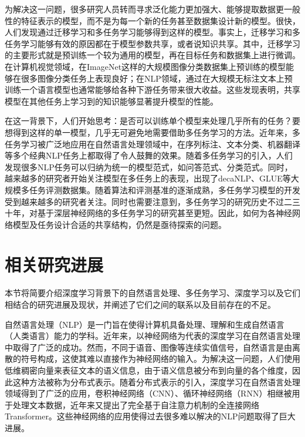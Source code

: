 为解决这一问题，很多研究人员转而寻求泛化能力更加强大、能够提取数据更一般性的特征表示的模型，而不是为每一个新的任务甚至数据集设计新的模型。很快，人们发现通过迁移学习和多任务学习能够得到这样的模型。事实上，迁移学习和多任务学习能够有效的原因都在于模型参数共享，或者说知识共享。其中，迁移学习的主要形式就是预训练一个较为通用的模型，再在目标任务和数据集上进行微调。在计算机视觉领域，在ImageNet\cite{DBLP:conf/cvpr/DengDSLL009}这样的大规模图像分类数据集上预训练的模型能够在很多图像分类任务上表现良好；在NLP领域，通过在大规模无标注文本上预训练一个语言模型也通常能够给各种下游任务带来很大收益\cite{DBLP:conf/naacl/PetersNIGCLZ18}\cite{radford2018improving}。这些发现表明，共享模型在其他任务上学习到的知识能够显著提升模型的性能。

在这一背景下，人们开始思考：是否可以训练单个模型来处理几乎所有的任务？要想得到这样的单一模型，几乎无可避免地需要借助多任务学习的方法。近年来，多任务学习被广泛地应用在自然语言处理领域中，在序列标注、文本分类、机器翻译等多个经典NLP任务上都取得了令人鼓舞的效果。随着多任务学习的引入，人们发现很多NLP任务可以归纳为统一的模型范式，如问答范式\cite{mccann2018natural}、分类范式\cite{radford2018improving}\cite{devlin2018bert}。同时，越来越多的研究者开始关注模型在多任务上的表现，出现了decaNLP\cite{mccann2018natural}、GLUE\cite{DBLP:conf/emnlp/WangSMHLB18}等大规模多任务评测数据集。随着算法和评测基准的逐渐成熟，多任务学习模型的开发受到越来越多的研究者关注。同时也需要注意到，多任务学习的研究历史不过二三十年，对基于深层神经网络的多任务学习的研究甚至更短。因此，如何为各神经网络模型及任务设计合适的共享结构，仍然是亟待探索的问题。

\section{相关研究进展}

本节将简要介绍深度学习背景下的自然语言处理、多任务学习、深度学习以及它们相结合的研究进展及现状，并阐述了它们之间的联系以及目前存在的不足。

自然语言处理（NLP）是一门旨在使得计算机具备处理、理解和生成自然语言（人类语言）能力的学科。近年来，以神经网络为代表的深度学习在自然语言处理\cite{DBLP:journals/jmlr/CollobertWBKKK11}\cite{DBLP:conf/emnlp/BordesCW14}\cite{DBLP:conf/acl/JeanCMB15}\cite{DBLP:conf/nips/SutskeverVL14}中取得了广泛的成功。然而，不同于语音、图像等连续实值信号，自然语言是由离散的符号构成，这使其难以直接作为神经网络的输入。为解决这一问题，人们使用低维稠密向量来表征文本的语义信息\cite{DBLP:conf/nips/MikolovSCCD13}\cite{DBLP:conf/emnlp/PenningtonSM14}，由于语义信息被分布到向量的各个维度，因此这种方法被称为分布式表示。随着分布式表示的引入，深度学习在自然语言处理领域得到了广泛的应用，卷积神经网络（CNN）、循环神经网络（RNN）相继被用于处理文本数据，近年来又提出了完全基于自注意力机制的全连接网络Transformer。这些神经网络的应用使得过去很多难以解决的NLP问题取得了巨大进展。

